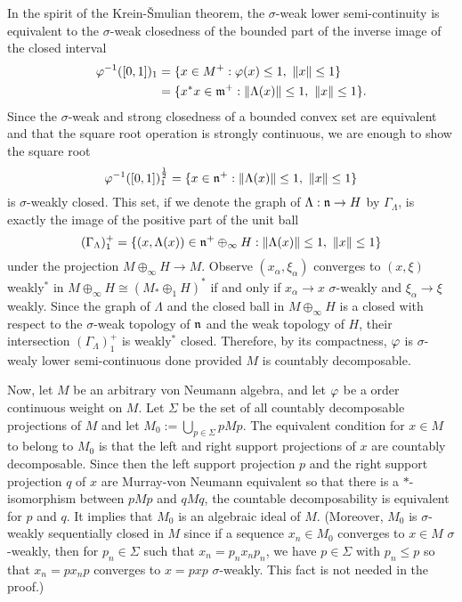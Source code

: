 \documentclass{../../../small}
\begin{document}
\begin{pf}
In the spirit of the Krein-\v Smulian theorem, the $\sigma$-weak lower semi-continuity is equivalent to the $\sigma$-weak closedness of the bounded part of the inverse image of the closed interval
\begin{align*}
\varphi^{-1}([0,1])_1
&=\{x\in M^+:\varphi(x)\le1,\ \|x\|\le1\}\\
&=\{x^*x\in\mathfrak{m}^+:\|\Lambda(x)\|\le1,\ \|x\|\le1\}.
\end{align*}
Since the $\sigma$-weak and strong closedness of a bounded convex set are equivalent and that the square root operation is strongly continuous, we are enough to show the square root
\[\f^{-1}([0,1])_1^{\frac12}=\{x\in\fn^+:\|\Lambda(x)\|\le1,\ \|x\|\le1\}\]
is $\sigma$-weakly closed.
This set, if we denote the graph of $\Lambda:\mathfrak{n}\to H$ by $\Gamma_\Lambda$, is exactly the image of the positive part of the unit ball
\[(\Gamma_\Lambda)^+_1=\{(x,\Lambda(x))\in\mathfrak{n}^+\oplus_\infty H:\|\Lambda(x)\|\le1,\ \|x\|\le1\}\]
under the projection $M\oplus_\infty H\to M$.
Observe $(x_\alpha,\xi_\alpha)$ converges to $(x,\xi)$ weakly$^*$ in $M\oplus_\infty H\cong(M_*\oplus_1H)^*$ if and only if $x_\alpha\to x$ $\sigma$-weakly and $\xi_\alpha\to\xi$ weakly.
Since the graph of $\Lambda$ and the closed ball in $M\oplus_\infty H$ is a closed with respect to the $\sigma$-weak topology of $\mathfrak{n}$ and the weak topology of $H$, their intersection $(\Gamma_\Lambda)_1^+$ is weakly$^*$ closed.
Therefore, by its compactness, $\varphi$ is $\sigma$-wealy lower semi-continuous done provided $M$ is countably decomposable.


Now, let $M$ be an arbitrary von Neumann algebra, and let $\varphi$ be a order continuous weight on $M$.
Let $\Sigma$ be the set of all countably decomposable projections of $M$ and let $M_0:=\bigcup_{p\in\Sigma}pMp$.
The equivalent condition for $x\in M$ to belong to $M_0$ is that the left and right support projections of $x$ are countably decomposable.
Since then the left support projection $p$ and the right support projection $q$ of $x$ are Murray-von Neumann equivalent so that there is a $*$-isomorphism between $pMp$ and $qMq$, the countable decomposability is equivalent for $p$ and $q$.
It implies that $M_0$ is an algebraic ideal of $M$.
(Moreover, $M_0$ is $\sigma$-weakly sequentially closed in $M$ since if a sequence $x_n\in M_0$ converges to $x\in M$ $\sigma$-weakly, then for $p_n\in\Sigma$ such that $x_n=p_nx_np_n$, we have $p\in\Sigma$ with $p_n\le p$ so that $x_n=px_np$ converges to $x=pxp$ $\sigma$-weakly.
This fact is not needed in the proof.)


\end{pf}
\end{document}
